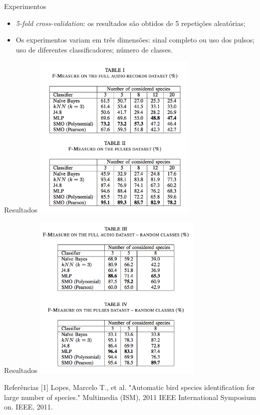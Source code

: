 \documentclass[10pt]{beamer}
\begin{document}
\begin{frame}[fragile]{Experimentos}
\begin{itemize}
\item \textit{5-fold cross-validation}: os resultados são obtidos de 5 repetições
aleatórias;
\item Os experimentos variam em três dimensões: sinal completo ou uso dos pulsos;
uso de diferentes classificadores; número de classes.
\end{itemize}
\end{frame}

\begin{frame}[fragile]{Resultados}
\includegraphics[width=\textwidth, height=8cm]{table12}
\end{frame}


\begin{frame}[fragile]{Resultados}
\includegraphics[width=\textwidth, height=8cm]{table34}
\end{frame}

\begin{frame}[fragile]{Referências}
[1] Lopes, Marcelo T., et al. "Automatic bird species identification for large number of species." Multimedia (ISM), 2011 IEEE International Symposium on. IEEE, 2011.
\\
\end{frame}
\end{document}

